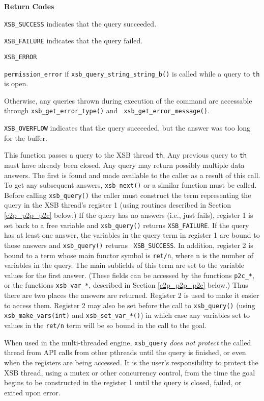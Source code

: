 \begin{description}
{\bf Return Codes}  
\bi
\item {\tt XSB\_SUCCESS} indicates that the query succeeded.
%
\item {\tt XSB\_FAILURE} indicates that the query failed.
%
\item {\tt XSB\_ERROR} 
\bi
\item {\tt permission\_error} if {\tt xsb\_query\_string\_string\_b()}
  is called while a query to {\tt th} is open.
%
\item Otherwise, any queries thrown during execution of the command
  are accessable through {\tt xsb\_get\_error\_type()} and {\tt
    xsb\_get\_error\_message()}.
\ei

\item {\tt XSB\_OVERFLOW} indicates that the query succeeded, but the
  answer was too long for the buffer.
%
\ei

%
This function passes a query to the XSB thread {\tt th}.  Any previous
query to {\tt th} must have already been closed.  Any query may return
possibly multiple data answers.  The first is found and made available
to the caller as a result of this call.  To get any subsequent
answers, {\tt xsb\_next()} or a similar function must be called.
Before calling {\tt xsb\_query()} the caller must construct the term
representing the query in the XSB thread's register 1 (using routines
described in Section \ref{c2p_p2p_p2c} below.)  If the query has no
answers (i.e., just fails), register 1 is set back to a free variable
and {\tt xsb\_query()} returns {\tt XSB\_FAILURE}.  If the query has
at least one answer, the variables in the query term in register 1 are
bound to those answers and {\tt xsb\_query()} returns {\tt
  XSB\_SUCCESS}.  In addition, register 2 is bound to a term whose
main functor symbol is {\tt ret/n}, where n is the number of variables
in the query. The main subfields of this term are set to the variable
values for the first answer. (These fields can be accessed by the
functions {\tt p2c\_*}, or the functions {\tt xsb\_var\_*}, described
in Section \ref{c2p_p2p_p2c} below.)  Thus there are two places the
answers are returned. Register 2 is used to make it easier to access
them.  Register 2 may also be set before the call to {\tt xsb\_query()}
(using {\tt xsb\_make\_vars(int)} and {\tt xsb\_set\_var\_*()}) in
which case any variables set to values in the {\tt ret/n} term will be
so bound in the call to the goal.

When used in the multi-threaded engine, {\tt xsb\_query} {\em does not
  protect} the called thread from API calls from other pthreads until
the query is finished, or even when the registers are being accessed.
It is the user's responsibility to protect the XSB thread, using a
mutex or other concurrency control, from the time the goal begins to
be constructed in the register 1 until the query is closed, failed, or
exited upon error.


\end{description}
